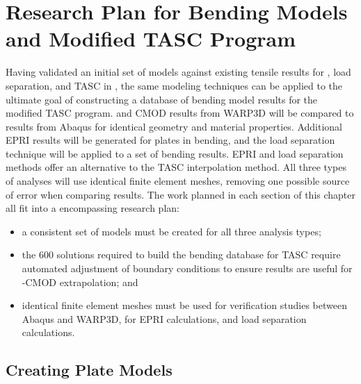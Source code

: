 \chapter{Research Plan for Bending Models and Modified TASC Program}
\label{chap:research-plan}

Having validated an initial set of models against existing tensile results for \hone, load separation, and TASC in , the same modeling techniques can be applied to the ultimate goal of constructing a database of bending model results for the modified TASC program.
\J and CMOD results from WARP3D will be compared to results from Abaqus for identical geometry and material properties.
Additional EPRI \hone results will be generated for plates in bending, and the load separation technique will be applied to a set of bending results.
EPRI \hone and load separation methods offer an alternative to the TASC interpolation method.
All three types of analyses will use identical finite element meshes, removing one possible source of error when comparing results.
The work planned in each section of this chapter all fit into a encompassing research plan:
\begin{itemize}
\item a consistent set of models must be created for all three analysis types;
\item the 600 solutions required to build the bending database for TASC require automated adjustment of boundary conditions to ensure results are useful for \J-CMOD extrapolation; and
\item identical finite element meshes must be used for verification studies between Abaqus and WARP3D, for EPRI \hone calculations, and load separation calculations.
\end{itemize}

\section{Creating Plate Models}
\label{sec:preprocess}

